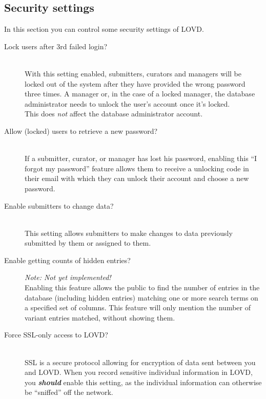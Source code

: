 \documentclass[a4paper,oneside,openany,12pt]{memoir}
\begin{document}
\hypertarget{ss_security_settings}{}
\subsection{Security settings}
In this section you can control some security settings of LOVD.
\begin{description}
  \item[Lock users after 3rd failed login?] \hfill \\
  With this setting enabled, submitters, curators and managers will be locked out of the system after they have provided the wrong password three times.
  A manager or, in the case of a locked manager, the database administrator needs to unlock the user's account once it's locked.
  \\
  This does \emph{not} affect the database administrator account.
  \item[Allow (locked) users to retrieve a new password?] \hfill \\
  If a submitter, curator, or manager has lost his password, enabling this ``I forgot my password''
   feature allows them to receive a unlocking code in their email with which they can unlock their account and choose a new password.
  \item[Enable submitters to change data?] \hfill \\
  This setting allows submitters to make changes to data previously submitted by them or assigned to them.
  \item[Enable getting counts of hidden entries?] \hfill \par
  \emph{Note: Not yet implemented!}
  \\
  Enabling this feature allows the public to find the number of entries in the database
   (including hidden entries) matching one or more search terms on a specified set of columns.
  This feature will only mention the number of variant entries matched, without showing them.
  \item[Force SSL-only access to LOVD?] \hfill \\
  \nopagebreak
  SSL is a secure protocol allowing for encryption of data sent between you and LOVD.
  \nopagebreak
  When you record sensitive individual information in LOVD, you \emph{\textbf{should}} enable this setting,
   as the individual information can otherwise be ``sniffed'' off the network.

\end{description}
\end{document}

